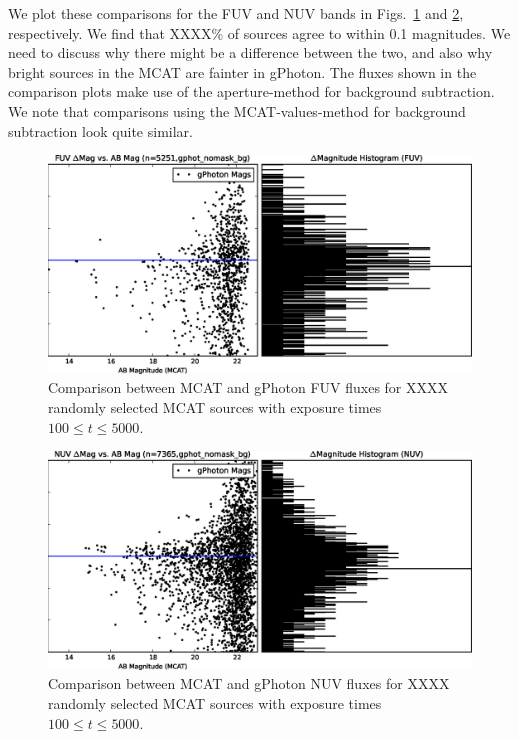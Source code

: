 \documentclass[5p]{elsarticle}
\begin{document}
We plot these comparisons for the FUV and NUV bands in Figs.\ \ref{fuvrelphot} and \ref{nuvrelphot}, respectively.  We find that {\color{red}XXXX\%} of sources agree to within 0.1 magnitudes.  {\color{red}We need to discuss why there might be a difference between the two, and also why bright sources in the MCAT are fainter in gPhoton.}  The fluxes shown in the comparison plots make use of the aperture-method for background subtraction.  We note that comparisons using the MCAT-values-method for background subtraction look quite similar.

\begin{figure}
\includegraphics[scale=0.35]{FigRelPhotFUV.eps}
\caption{Comparison between MCAT and gPhoton FUV fluxes for {\color{red}XXXX} randomly selected MCAT sources with exposure times $100 \leq t \leq 5000$. \label{fuvrelphot}}
\end{figure}

\begin{figure}
\includegraphics[scale=0.35]{FigRelPhotNUV.eps}
\caption{Comparison between MCAT and gPhoton NUV fluxes for {\color{red}XXXX} randomly selected MCAT sources with exposure times $100 \leq t \leq 5000$. \label{nuvrelphot}}
\end{figure}
\end{document}

